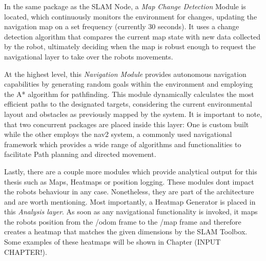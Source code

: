 \documentclass[%
paper=A4,               %
twoside=true,           %
openright,              %
11pt,                   %
bibliography=totoc,     %
titlepage=on,           %
DIV=12,                 %
BCOR=1.5cm,             %
parskip=half,            %
final
]{scrreprt}
\begin{document}
	In the same package as the SLAM Node, a \textit{Map Change Detection} Module is located, which continuously monitors the environment for changes, updating the navigation map on a set frequency (currently 30 seconds). It uses a change detection algorithm that compares the current map state with new data collected by the robot, ultimately deciding when the map is robust enough to request the navigational layer to take over the robots movements. 
	
	At the highest level, this \textit{Navigation Module} provides autonomous navigation capabilities by generating random goals within the environment and employing the A* algorithm for pathfinding. This module dynamically calculates the most efficient paths to the designated targets, considering the current environmental layout and obstacles as previously mapped by the system. It is important to note, that two concurrent packages are placed inside this layer: One is custom built while the other employs the nav2 system, a commonly used navigational framework which provides a wide range of algorithms and functionalities to facilitate Path planning and directed movement. \autocite{macenskiMarathonNavigationSystem2020}
	
	Lastly, there are a couple more modules which provide analytical output for this thesis such as Maps, Heatmaps or position logging. These modules dont impact the robots behaviour in any case. Nonetheless, they are part of the architecture and are worth mentioning. Most importantly, a Heatmap Generator is placed in this \textit{Analysis layer}. As soon as any navigational functionality is invoked, it maps the robots position from the /odom frame to the /map frame and therefore creates a heatmap that matches the given dimensions by the SLAM Toolbox. Some examples of these heatmaps will be shown in Chapter (INPUT CHAPTER!).
	
\end{document}
